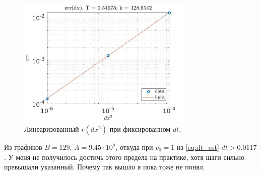 \documentclass[a4paper,12pt]{article} %
\begin{document}
\begin{figure}[h!]
\begin{center}
\includegraphics[width=0.75\textwidth]{./pics/RK4_dx2}
\end{center}
\caption{Линеаризованный $r(dx^2)$ при фиксированном $dt$.} \label{img:RK4_dx2}
\end{figure}

Из графиков $B = 129$, $A = 9.45 \cdot 10^5$, откуда при $v_0 = 1$ из \eqref{eq:dt_est} $dt > 0.0117$. У меня не получилось достичь этого предела на практике, хотя шаги сильно превышали указанный. Почему так вышло я пока тоже не понял.
\end{document}
